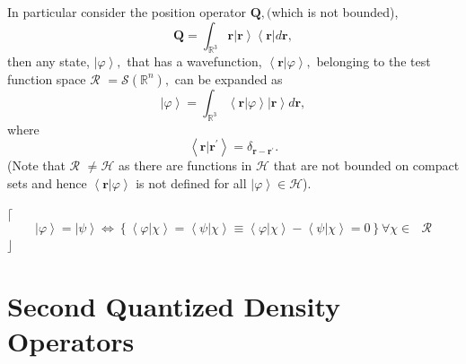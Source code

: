 \documentclass[aps,preprint]{revtex4}%
\begin{document}
In particular consider the position operator $\mathbf{Q},($which is not
bounded),
\begin{equation}
\mathbf{Q}=\int_{\mathbb{R}^{3}}\mathbf{r}\left\vert \mathbf{r}\right\rangle
\left\langle \mathbf{r}\right\vert d\mathbf{r,}%
\end{equation}
then any state, $\left\vert \varphi\right\rangle ,$ that has a wavefunction,
$\left\langle \left.  \mathbf{r}\right\vert \varphi\right\rangle ,$ belonging
to the test function space $\mathcal{R}$ $=\mathcal{S}\left(  \mathbb{R}%
^{n}\right)  ,$ can be expanded as
\begin{equation}
\left\vert \varphi\right\rangle =\int_{\mathbb{R}^{3}}\left\langle \left.
\mathbf{r}\right\vert \varphi\right\rangle \left\vert \mathbf{r}\right\rangle
d\mathbf{r,}%
\end{equation}
where
\begin{equation}
\left\langle \left.  \mathbf{r}\right\vert \mathbf{r}^{\prime}\right\rangle
=\delta_{\mathbf{r-r}^{\prime}}.
\end{equation}
(Note that $\mathcal{R}$ $\neq\mathcal{H}$ as there are functions in
$\mathcal{H}$ that are not bounded on compact sets and hence $\left\langle
\left.  \mathbf{r}\right\vert \varphi\right\rangle $ is not defined for all
$\left\vert \varphi\right\rangle \in\mathcal{H}$).

$\lceil$%
\begin{equation}
\left\vert \varphi\right\rangle =\left\vert \psi\right\rangle \text{
}\Leftrightarrow\left\{  \left\langle \left.  \varphi\right\vert
\chi\right\rangle =\left\langle \left.  \psi\right\vert \chi\right\rangle
\equiv\left\langle \left.  \varphi\right\vert \chi\right\rangle -\left\langle
\left.  \psi\right\vert \chi\right\rangle =0\right\}  \forall\chi\mathbf{\in
}\text{ }\mathcal{R}%
\end{equation}
$\rfloor$

\section{Second Quantized Density Operators \label{SecQuant}}
\end{document}
